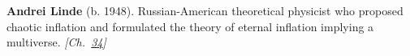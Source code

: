 \textbf{Andrei Linde} (b. 1948). Russian-American theoretical physicist who proposed chaotic inflation and formulated the theory of eternal inflation implying a multiverse. \emph{[Ch.~\hyperref[ch:boltzmannbrain]{34}]}


